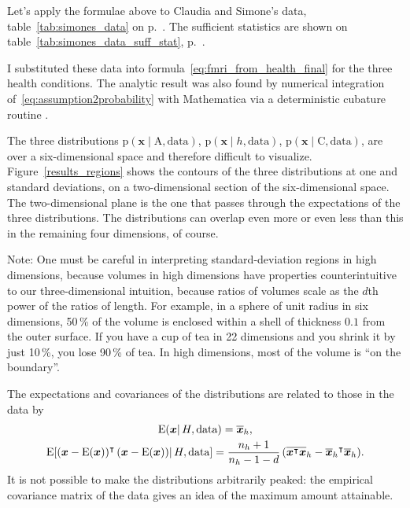 \documentclass[\ifafour a4paper,12pt,\else a5paper,10pt,\fi%
onecolumn,oneside,article,%
british%
]{memoir}
\theoremstyle{remark}
\theoremstyle{innote}
\newcommand*{\citep}{\parencites}
\DeclarePairedDelimiter\clcl{[}{]}
\newcommand*{\pf}{\mathrm{p}}%
\renewcommand*{\|}{\mathpunct{|}}
\newcommand*{\T}{^\intercal}%
\newcommand*{\E}{\mathrm{E}}
\DeclarePairedDelimiter\expp{(}{)}
\newcommand*{\expe}{\E\expp}%
\newcommand*{\expeb}{\E\clcl}%
\newcommand*{\yH}{H}
\newcommand*{\yh}{h}
\newcommand*{\yx}{x}
\newcommand*{\yxx}{\bm{\yx}}
\newcommand*{\data}{\text{data}}
\newcommand*{\ya}{\mathrm{A}}
\newcommand*{\yi}{\mathrm{C}}
\newcommand*{\yn}{n}
\newcommand*{\yd}{d}
\newcommand*{\yno}{\yn_{\yh}}
\newcommand*{\vxxo}{\overline{\yxx}_{\yh}}
\newcommand*{\vxto}{\overline{\yxx\T\yxx}_{\yh}}
\theoremstyle{plain}
\begin{document}
Let's apply the formulae above to Claudia and Simone's data,
table~\ref{tab:simones_data} on p.~\pageref{tab:simones_data}. The
sufficient statistics are shown on table~\ref{tab:simones_data_suff_stat},
p.~\pageref{tab:simones_data_suff_stat}.



I substituted these data into formula~\eqref{eq:fmri_from_health_final} for
the three health conditions. The analytic result was also found by
numerical integration of~\eqref{eq:assumption2probability} with Mathematica
via a deterministic cubature routine \citep{hahn2005}.

The three distributions
\label{eq:results_discussion}$ \pf(\yxx \| \ya, \data)$,
$ \pf(\yxx \| \yh, \data)$, $ \pf(\yxx \| \yi, \data)$, are over a
six-dimensional space and therefore difficult to visualize.
Figure~\ref{results_regions} shows the contours of the three distributions
at one and standard deviations, on a two-dimensional section of the
six-dimensional space. The two-dimensional plane is the one that passes
through the expectations of the three distributions. The distributions can
overlap even more or even less than this in the remaining four dimensions,
of course.

Note: One must be careful in interpreting standard-deviation regions in high
dimensions, because volumes in high dimensions have properties
counterintuitive to our three-dimensional intuition, because ratios of
volumes scale as the $\yd$th power of the ratios of length. For example, in
a sphere of unit radius in six dimensions, 50\,\% of the volume is enclosed
within a shell of thickness $0.1$ from the outer surface. If you have a cup
of tea in 22 dimensions and you shrink it by just 10\,\%, you lose 90\,\%
of tea. In high dimensions, most of the volume is \enquote{on the
  boundary}.

The expectations and covariances of the distributions are related to those
in the data by
\begin{equation}
  \label{eq:moments_tstudent}
  \begin{gathered}
    \expe{\yxx \|\yH,\data} = \vxxo,\\
    \expeb{(\yxx-\expe{\yxx})\T\,(\yxx-\expe{\yxx}) \|\yH,\data}
    =\frac{\yno+1}{\yno-1-\yd}\,(\vxto-{\vxxo}\T\vxxo).
  \end{gathered}
\end{equation}
It is not possible to make the distributions arbitrarily peaked: the
empirical covariance matrix of the data gives an idea of the maximum
amount attainable.
\end{document}
